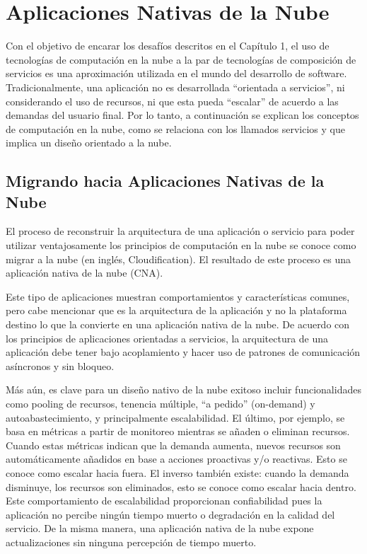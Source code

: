 \chapter{Aplicaciones Nativas de la Nube}

    Con el objetivo de encarar los desafíos descritos en el Capítulo 1, el
    uso de tecnologías de computación en la nube a la par de tecnologías de
    composición de servicios es una aproximación utilizada en el mundo del
    desarrollo de software. Tradicionalmente, una aplicación no es
    desarrollada ``orientada a servicios'', ni considerando el uso de
    recursos, ni que esta pueda ``escalar'' de acuerdo a las demandas del
    usuario final. Por lo tanto, a continuación se explican los conceptos de
    computación en la nube, como se relaciona con los llamados servicios y
    que implica un diseño orientado a la nube.

    
	\section{Migrando hacia Aplicaciones Nativas de la Nube}
	
    El proceso de reconstruir la arquitectura de una aplicación o servicio para poder utilizar ventajosamente los principios de computación en la nube se conoce como migrar a la nube (en inglés, Cloudification). El resultado de este proceso es una aplicación nativa de la nube (CNA). 
    
    Este tipo de aplicaciones muestran comportamientos y características comunes, pero cabe mencionar que es la arquitectura de la aplicación y no la plataforma destino lo que la convierte en una aplicación nativa de la nube. De acuerdo con los principios de aplicaciones orientadas a servicios, la arquitectura de una aplicación debe tener bajo acoplamiento y hacer uso de patrones de comunicación asíncronos y sin bloqueo. 
    
    Más aún, es clave para un diseño nativo de la nube exitoso incluir funcionalidades como pooling de recursos, tenencia múltiple, “a pedido” (on-demand) y autoabastecimiento, y principalmente escalabilidad. El último, por ejemplo, se basa en métricas a partir de monitoreo mientras se añaden o eliminan recursos. Cuando estas métricas indican que la demanda aumenta, nuevos recursos son automáticamente añadidos en base a acciones proactivas y/o reactivas. Esto se conoce como escalar hacia fuera. El inverso también existe: cuando la demanda disminuye, los recursos son eliminados, esto se conoce como escalar hacia dentro. Este comportamiento de escalabilidad proporcionan confiabilidad pues la aplicación no percibe ningún tiempo muerto o degradación en la calidad del servicio. De la misma manera, una aplicación nativa de la nube expone actualizaciones sin ninguna percepción de tiempo muerto. 
    

